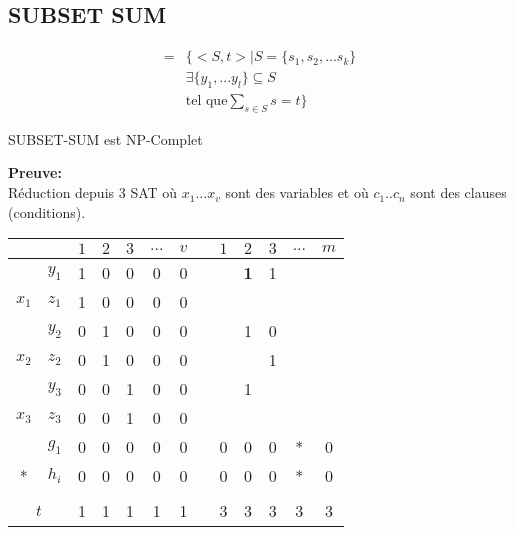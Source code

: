 \documentclass[a4paper,12pt]{article}
\begin{document}
  \subsection{SUBSET SUM}
    \begin{align*}
      = &\Big\{ <S, t> | S = \{s_1, s_2, ... s_k\}\\
      &\exists \{y_1, ... y_l\} \subseteq S\\
      &\text{tel que} \sum\limits_{s \in S} s = t \Big\}
    \end{align*}
  
    \begin{theoremeBox}
      SUBSET-SUM est NP-Complet
    \end{theoremeBox}
    \textbf{Preuve:}\\
    Réduction depuis 3 SAT où $x_1 ... x_v$ sont des variables et où $c_1 .. c_n$ sont des clauses (conditions).
    
    \begin{table}[h]
      \centering
      \begin{tabular}{c|c|c|c|c|c|c|c|c|c|c|c|c|}
	\cline{3-13}
	\multicolumn{2}{c|}{} & $1$ & $2$ & $3$ & $...$ & $v$ &  & $1$ & $2$ & $3$ & $...$ & $m$ \\ \hline
	\multicolumn{1}{|c|}{} & $y_1$ & 1 & 0 & 0 & 0 & 0 &  &  & {\color[HTML]{32CB00} \textbf{1}} & 1 &  &  \\ \cline{2-13} 
	\multicolumn{1}{|c|}{\multirow{-2}{*}{$x_1$}} & $z_1$ & 1 & 0 & 0 & 0 & 0 &  &  &  &  &  &  \\ \hline
	\multicolumn{1}{|c|}{} & $y_2$ & 0 & 1 & 0 & 0 & 0 &  &  & 1 & 0 &  &  \\ \cline{2-13} 
	\multicolumn{1}{|c|}{\multirow{-2}{*}{$x_2$}} & $z_2$ & 0 & 1 & 0 & 0 & 0 &  &  &  & {\color[HTML]{FD6864} 1} &  &  \\ \hline
	\multicolumn{1}{|c|}{} & $y_3$ & 0 & 0 & 1 & 0 & 0 &  &  & 1 &  &  &  \\ \cline{2-13} 
	\multicolumn{1}{|c|}{\multirow{-2}{*}{$x_3$}} & $z_3$ & 0 & 0 & 1 & 0 & 0 &  &  &  &  &  &  \\ \hline
	\multicolumn{1}{|c|}{} & $g_1$ & 0 & 0 & 0 & 0 & 0 &  & 0 & 0 & 0 & * & 0 \\ \cline{2-13} 
	\multicolumn{1}{|c|}{\multirow{-2}{*}{*}} & $h_i$ & 0 & 0 & 0 & 0 & 0 &  & 0 & 0 & 0 & * & 0 \\ \hline
	\multicolumn{2}{|c|}{} &  &  &  &  &  &  &  &  &  &  &  \\ \hline
	\multicolumn{2}{|c|}{$t$} & 1 & 1 & 1 & 1 & 1 &  & 3 & 3 & 3 & 3 & 3 \\ \hline
      \end{tabular}
    \end{table}
    
\end{document}
